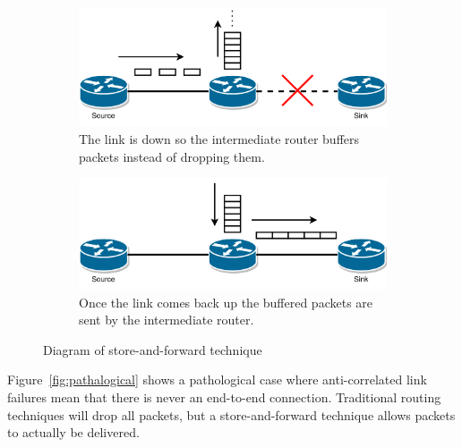 \documentclass[withindex,glossary,openany]{cam-thesis}
\begin{document}
\begin{figure}[H]
\centering
\begin{subfigure}{1\textwidth}
  \centering
  \includegraphics[width=0.57\linewidth]{storeandforward_down}
  \caption{The link is down so the intermediate router buffers packets instead of dropping them.}
  \label{fig:saf_down}
\end{subfigure}
\begin{subfigure}{1\textwidth}
  \centering
  \includegraphics[width=0.57\linewidth]{storeandforward_up}
  \caption{Once the link comes back up the buffered packets are sent by the intermediate router.}
  \label{fig:saf_up}
\end{subfigure}
\caption{Diagram of store-and-forward technique}
\label{fig:saf}
\end{figure}

Figure~\ref{fig:pathalogical} shows a pathological case where anti-correlated link failures mean that there is never an end-to-end connection. Traditional routing techniques will drop all packets, but a store-and-forward technique allows packets to actually be delivered.
\end{document}
